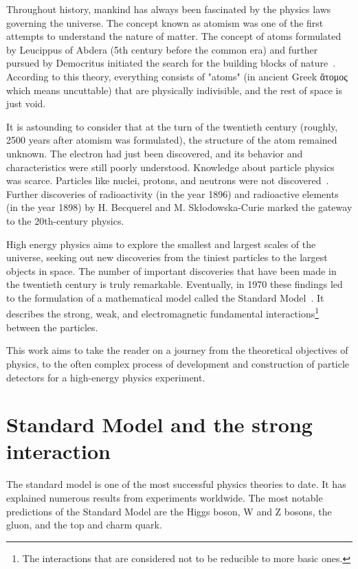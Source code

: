 Throughout history, mankind has always been fascinated by the physics laws governing the universe. The concept known as atomism was one of the first attempts to understand the nature of matter. The concept of atoms formulated by Leucippus of Abdera (5th century before the common era) and further pursued by Democritus initiated the search for the building blocks of nature~\cite{sep-atomism-ancient}. According to this theory, everything consists of "atoms" (in ancient Greek \foreignlanguage{greek}{ἄτομος} which means uncuttable) that are physically indivisible, and the rest of space is just void. 

It is astounding to consider that at the turn of the twentieth century (roughly, 2500 years after atomism was formulated), the structure of the atom remained unknown. The electron had just been discovered, and its behavior and characteristics were still poorly understood. Knowledge about particle physics was scarce. Particles like nuclei, protons, and neutrons were not discovered~\cite{intro_particle_physics}. 
Further discoveries of radioactivity (in the year 1896) and radioactive elements (in the year 1898) by H. Becquerel and M. Skłodowska-Curie marked the gateway to the 20th-century physics. 

High energy physics aims to explore the smallest and largest scales of the universe, seeking out new discoveries from the tiniest particles to the largest objects in space.
The number of important discoveries that have been made in the twentieth century is truly remarkable. Eventually, in 1970 these findings led to the formulation of a mathematical model called the Standard Model~\cite{intro_particle_physics}.  It describes the strong, weak, and electromagnetic fundamental interactions\footnote{The interactions that are considered not to be reducible to more basic ones.} between the particles. 
 
 
 This work aims to take the reader on a journey from the theoretical objectives of physics, to the often complex process of development and construction of particle detectors for a high-energy physics experiment.
 
\section{Standard Model and the strong interaction}

The standard model is one of the most successful physics theories to date. It has explained numerous results from experiments worldwide. The most notable predictions of the Standard Model are the Higgs boson, W and Z bosons, the gluon, and the top and charm quark.

